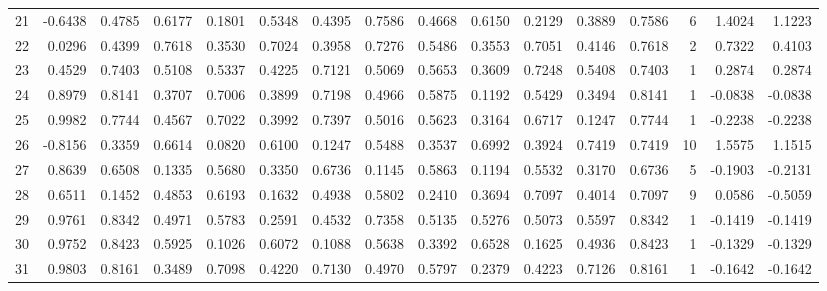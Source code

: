 \begin{tabular}{lrrrrrrrrrrrrrrr}
21  &     -0.6438 &  0.4785 &  0.6177 &  0.1801 &  0.5348 &  0.4395 &  0.7586 &  0.4668 &  0.6150 &  0.2129 &   0.3889 &     0.7586 &      6 &                    1.4024 &                     1.1223 \\
22  &      0.0296 &  0.4399 &  0.7618 &  0.3530 &  0.7024 &  0.3958 &  0.7276 &  0.5486 &  0.3553 &  0.7051 &   0.4146 &     0.7618 &      2 &                    0.7322 &                     0.4103 \\
23  &      0.4529 &  0.7403 &  0.5108 &  0.5337 &  0.4225 &  0.7121 &  0.5069 &  0.5653 &  0.3609 &  0.7248 &   0.5408 &     0.7403 &      1 &                    0.2874 &                     0.2874 \\
24  &      0.8979 &  0.8141 &  0.3707 &  0.7006 &  0.3899 &  0.7198 &  0.4966 &  0.5875 &  0.1192 &  0.5429 &   0.3494 &     0.8141 &      1 &                   -0.0838 &                    -0.0838 \\
25  &      0.9982 &  0.7744 &  0.4567 &  0.7022 &  0.3992 &  0.7397 &  0.5016 &  0.5623 &  0.3164 &  0.6717 &   0.1247 &     0.7744 &      1 &                   -0.2238 &                    -0.2238 \\
26  &     -0.8156 &  0.3359 &  0.6614 &  0.0820 &  0.6100 &  0.1247 &  0.5488 &  0.3537 &  0.6992 &  0.3924 &   0.7419 &     0.7419 &     10 &                    1.5575 &                     1.1515 \\
27  &      0.8639 &  0.6508 &  0.1335 &  0.5680 &  0.3350 &  0.6736 &  0.1145 &  0.5863 &  0.1194 &  0.5532 &   0.3170 &     0.6736 &      5 &                   -0.1903 &                    -0.2131 \\
28  &      0.6511 &  0.1452 &  0.4853 &  0.6193 &  0.1632 &  0.4938 &  0.5802 &  0.2410 &  0.3694 &  0.7097 &   0.4014 &     0.7097 &      9 &                    0.0586 &                    -0.5059 \\
29  &      0.9761 &  0.8342 &  0.4971 &  0.5783 &  0.2591 &  0.4532 &  0.7358 &  0.5135 &  0.5276 &  0.5073 &   0.5597 &     0.8342 &      1 &                   -0.1419 &                    -0.1419 \\
30  &      0.9752 &  0.8423 &  0.5925 &  0.1026 &  0.6072 &  0.1088 &  0.5638 &  0.3392 &  0.6528 &  0.1625 &   0.4936 &     0.8423 &      1 &                   -0.1329 &                    -0.1329 \\
31  &      0.9803 &  0.8161 &  0.3489 &  0.7098 &  0.4220 &  0.7130 &  0.4970 &  0.5797 &  0.2379 &  0.4223 &   0.7126 &     0.8161 &      1 &                   -0.1642 &                    -0.1642 \\

\end{tabular}
